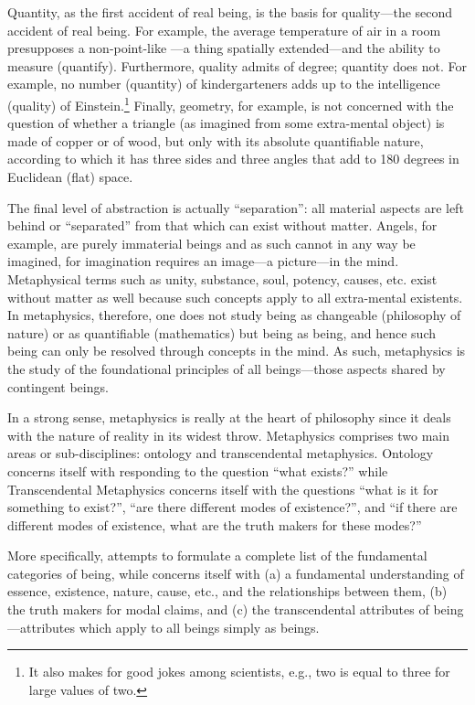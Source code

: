 Quantity, as the first accident of real being, is the basis for quality---the second accident of real being. For example, the average temperature of air in a room presupposes a non-point-like ---a thing spatially extended---and the ability to measure (quantify). Furthermore, quality admits of degree; quantity does not. For example, no number (quantity) of kindergarteners adds up to the intelligence (quality) of Einstein.\footnote{It also makes for good jokes among scientists, e.g., two is equal to three for large values of two.} Finally, geometry, for example, is not concerned with the question of whether a triangle (as imagined from some extra-mental object) is made of copper or of wood, but only with its absolute quantifiable nature, according to which it has three sides and three angles that add to 180 degrees in Euclidean (flat) space.

The final level of abstraction is actually ``separation'': all material aspects are left behind or ``separated'' from that which can exist without matter. Angels, for example, are purely immaterial beings and as such cannot in any way be imagined, for imagination requires an image---a picture---in the mind. Metaphysical terms such as unity, substance, soul, potency, causes, etc. exist without matter as well because such concepts apply to all extra-mental existents. In metaphysics, therefore, one does not study being as changeable (philosophy of nature) or as quantifiable (mathematics) but being as being, and hence such being can only be resolved through concepts in the mind. As such, metaphysics is the study of the foundational principles of all beings---those aspects shared by  contingent beings.

In a strong sense, metaphysics is really at the heart of philosophy since it deals with the nature of reality in its widest throw. Metaphysics comprises two main areas or sub-disciplines: ontology and transcendental metaphysics. Ontology concerns itself with responding to the question ``what exists?'' while Transcendental Metaphysics concerns itself with the questions ``what is it for something to exist?'', ``are there different modes of existence?'', and ``if there are different modes of existence, what are the truth makers for these modes?'' 

More specifically,  attempts to formulate a complete list of the fundamental categories of being, while  concerns itself with (a) a fundamental understanding of essence, existence, nature, cause, etc., and the relationships between them, (b) the truth makers for modal claims, and (c) the transcendental attributes of being---attributes which apply to all beings simply as beings.

